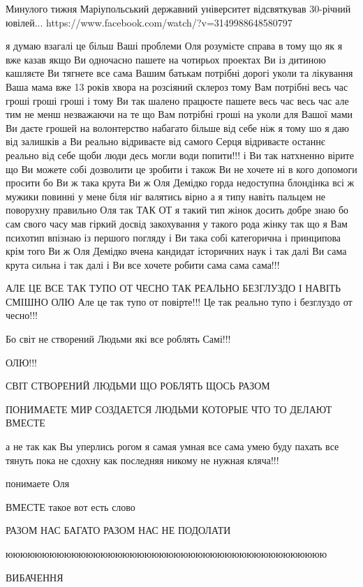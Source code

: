 Минулого тижня Маріупольський державний університет відсвяткував 30-річний ювілей...
https://www.facebook.com/watch/?v=3149988648580797

я думаю взагалі це більш Ваші проблеми Оля розумієте
справа в тому що як я вже казав
якщо Ви одночасно пашете на чотирьох проектах
Ви із дитиною кашляєте
Ви тягнете все сама
Вашим батькам потрібні дорогі уколи та лікування
Ваша мама вже 13 років хвора на розсіяний склероз
тому Вам потрібні весь час гроші гроші гроші
і тому Ви так шалено працюєте пашете весь час весь час
але тим не менш
незважаючи на те що Вам потрібні гроші на уколи для Вашої мами
Ви даєте грошей на волонтерство набагато більше від себе ніж я
тому шо я даю від залишків а Ви реально відриваєте від самого Серця
відриваєте останнє реально від себе щоби люди десь могли води попити!!!
і Ви так натхненно вірите
що 
   Ви можете собі дозволити це зробити
і також 
   Ви не хочете ні в кого допомоги просити
бо 
   Ви ж така крута Ви ж Оля Демідко горда недоступна блондінка 
      всі ж мужики повинні у мене біля ніг валятись вірно
         а я типу навіть пальцем не поворухну правильно Оля так
ТАК ОТ 
   я такий тип жінок досить добре знаю
       бо сам свого часу мав гіркий досвід закохування у такого рода жінку
          так що я Вам психотип впізнаю із першого погляду
і Ви така собі 
   категорична і принципова
      крім того Ви ж Оля Демідко вчена кандидат історичних наук і так далі
          Ви сама крута сильна і так далі і Ви все хочете робити сама сама сама!!!

АЛЕ ЦЕ ВСЕ ТАК ТУПО ОТ ЧЕСНО ТАК РЕАЛЬНО БЕЗГЛУЗДО І НАВІТЬ СМІШНО ОЛЮ
      Але це так тупо от повірте!!! Це так реально тупо і безглуздо от чесно!!!


Бо світ не створений Людьми які все роблять Самі!!!

ОЛЮ!!!

СВІТ СТВОРЕНИЙ ЛЮДЬМИ ЩО РОБЛЯТЬ ЩОСЬ РАЗОМ

ПОНИМАЕТЕ МИР СОЗДАЕТСЯ ЛЮДЬМИ КОТОРЫЕ ЧТО ТО ДЕЛАЮТ ВМЕСТЕ

а не так как Вы уперлись рогом я самая умная все сама умею буду
пахать все тянуть пока не сдохну как последняя никому не нужная кляча!!!

понимаете Оля

ВМЕСТЕ такое вот есть слово

РАЗОМ НАС БАГАТО РАЗОМ НАС НЕ ПОДОЛАТИ

юююююююююююююююююююююююююююююююююююююююююююю

ВИБАЧЕННЯ

